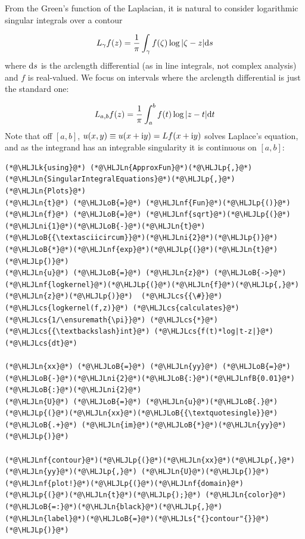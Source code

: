 \documentclass[12pt,a4paper]{article}
\newcommand{\HLJLk}[1]{\textcolor[RGB]{148,91,176}{\textbf{#1}}}
\newcommand{\HLJLn}[1]{#1}
\newcommand{\HLJLnf}[1]{\textcolor[RGB]{66,102,213}{#1}}
\newcommand{\HLJLs}[1]{\textcolor[RGB]{201,61,57}{#1}}
\newcommand{\HLJLnfB}[1]{\textcolor[RGB]{59,151,46}{#1}}
\newcommand{\HLJLni}[1]{\textcolor[RGB]{59,151,46}{#1}}
\newcommand{\HLJLoB}[1]{\textcolor[RGB]{102,102,102}{\textbf{#1}}}
\newcommand{\HLJLp}[1]{#1}
\newcommand{\HLJLcs}[1]{\textcolor[RGB]{153,153,119}{\textit{#1}}}
\def\D{ {\rm d} }
\def\I{ {\rm i} }
\def\dt{\D t}
\begin{document}
From the Green's function of the Laplacian, it is natural to consider logarithmic singular integrals over a contour

\[
L_\gamma f(z) = {1 \over \pi} \int_\gamma f(\zeta) \log|\zeta-z| \D s
\]
where $\D s$ is the arclength differential (as in line integrals, not complex analysis) and $f$ is real-valued. We focus on intervals where the arclength differential is just the standard one:

\[
L_{a,b} f(z) = {1 \over \pi }\int_a^b f(t) \log | z - t| \dt
\]
Note that off $[a,b]$, $u(x,y) \equiv u(x+\I y) = L f(x+\I y)$ solves Laplace's equation, and as the integrand has an integrable singularity it is continuous on $[a,b]$:


\begin{lstlisting}
(*@\HLJLk{using}@*) (*@\HLJLn{ApproxFun}@*)(*@\HLJLp{,}@*) (*@\HLJLn{SingularIntegralEquations}@*)(*@\HLJLp{,}@*) (*@\HLJLn{Plots}@*)
(*@\HLJLn{t}@*) (*@\HLJLoB{=}@*) (*@\HLJLnf{Fun}@*)(*@\HLJLp{()}@*)
(*@\HLJLn{f}@*) (*@\HLJLoB{=}@*) (*@\HLJLnf{sqrt}@*)(*@\HLJLp{(}@*)(*@\HLJLni{1}@*)(*@\HLJLoB{-}@*)(*@\HLJLn{t}@*)(*@\HLJLoB{{\textasciicircum}}@*)(*@\HLJLni{2}@*)(*@\HLJLp{)}@*)(*@\HLJLoB{*}@*)(*@\HLJLnf{exp}@*)(*@\HLJLp{(}@*)(*@\HLJLn{t}@*)(*@\HLJLp{)}@*)
(*@\HLJLn{u}@*) (*@\HLJLoB{=}@*) (*@\HLJLn{z}@*) (*@\HLJLoB{->}@*) (*@\HLJLnf{logkernel}@*)(*@\HLJLp{(}@*)(*@\HLJLn{f}@*)(*@\HLJLp{,}@*) (*@\HLJLn{z}@*)(*@\HLJLp{)}@*)  (*@\HLJLcs{{\#}}@*) (*@\HLJLcs{logkernel(f,z)}@*) (*@\HLJLcs{calculates}@*) (*@\HLJLcs{1/\ensuremath{\pi}}@*) (*@\HLJLcs{*}@*) (*@\HLJLcs{{\textbackslash}int}@*) (*@\HLJLcs{f(t)*log|t-z|}@*) (*@\HLJLcs{dt}@*)

(*@\HLJLn{xx}@*) (*@\HLJLoB{=}@*) (*@\HLJLn{yy}@*) (*@\HLJLoB{=}@*) (*@\HLJLoB{-}@*)(*@\HLJLni{2}@*)(*@\HLJLoB{:}@*)(*@\HLJLnfB{0.01}@*)(*@\HLJLoB{:}@*)(*@\HLJLni{2}@*)
(*@\HLJLn{U}@*) (*@\HLJLoB{=}@*) (*@\HLJLn{u}@*)(*@\HLJLoB{.}@*)(*@\HLJLp{(}@*)(*@\HLJLn{xx}@*)(*@\HLJLoB{{\textquotesingle}}@*) (*@\HLJLoB{.+}@*) (*@\HLJLn{im}@*)(*@\HLJLoB{*}@*)(*@\HLJLn{yy}@*)(*@\HLJLp{)}@*)

(*@\HLJLnf{contour}@*)(*@\HLJLp{(}@*)(*@\HLJLn{xx}@*)(*@\HLJLp{,}@*) (*@\HLJLn{yy}@*)(*@\HLJLp{,}@*) (*@\HLJLn{U}@*)(*@\HLJLp{)}@*)
(*@\HLJLnf{plot!}@*)(*@\HLJLp{(}@*)(*@\HLJLnf{domain}@*)(*@\HLJLp{(}@*)(*@\HLJLn{t}@*)(*@\HLJLp{);}@*) (*@\HLJLn{color}@*)(*@\HLJLoB{=:}@*)(*@\HLJLn{black}@*)(*@\HLJLp{,}@*) (*@\HLJLn{label}@*)(*@\HLJLoB{=}@*)(*@\HLJLs{"{}contour"{}}@*)(*@\HLJLp{)}@*)
\end{lstlisting}
\end{document}
